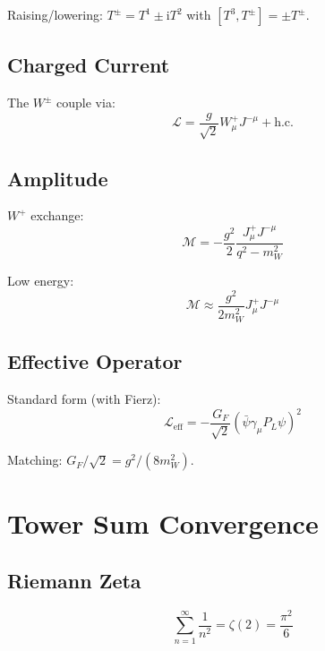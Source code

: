 \documentclass[11pt,a4paper]{article}
\newcommand{\ii}{\mathrm{i}}
\begin{document}
Raising/lowering: $T^{\pm} = T^1 \pm \ii T^2$ with $[T^3, T^{\pm}] = \pm T^{\pm}$.

\subsection{Charged Current}

The $W^{\pm}$ couple via:
\begin{equation}
\mathcal{L} = \frac{g}{\sqrt{2}} W_\mu^+ J^{-\mu} + \text{h.c.}
\label{eq:cc-coupling}
\end{equation}

\subsection{Amplitude}

$W^+$ exchange:
\begin{equation}
\mathcal{M} = -\frac{g^2}{2} \frac{J_\mu^+ J^{-\mu}}{q^2 - m_W^2}
\label{eq:w-amplitude}
\end{equation}

Low energy:
\begin{equation}
\mathcal{M} \approx \frac{g^2}{2m_W^2} J_\mu^+ J^{-\mu}
\label{eq:w-low}
\end{equation}

\subsection{Effective Operator}

Standard form (with Fierz):
\begin{equation}
\mathcal{L}_{\text{eff}} = -\frac{G_F}{\sqrt{2}} (\bar{\psi}\gamma_\mu P_L \psi)^2
\label{eq:eff-standard}
\end{equation}

Matching: $G_F/\sqrt{2} = g^2/(8m_W^2)$.

\section{Tower Sum Convergence}
\label{app:convergence}

\subsection{Riemann Zeta}

\begin{equation}
\sum_{n=1}^{\infty} \frac{1}{n^2} = \zeta(2) = \frac{\pi^2}{6}
\label{eq:zeta2}
\end{equation}
\end{document}
